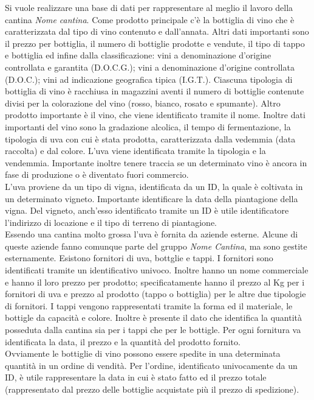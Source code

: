 Si vuole realizzare una base di dati per rappresentare al meglio il lavoro della cantina \emph{Nome cantina}. Come prodotto principale c'è la bottiglia di vino che è caratterizzata dal tipo di vino contenuto e dall'annata. Altri dati importanti sono il prezzo per bottiglia, il numero di bottiglie prodotte e vendute, il tipo di tappo e bottiglia ed infine dalla classificazione: vini a denominazione d'origine controllata e garantita (D.O.C.G.); vini a denominazione d'origine controllata (D.O.C.); vini ad indicazione geografica tipica (I.G.T.). Ciascuna tipologia di bottiglia di vino è racchiusa in magazzini aventi il numero di bottiglie contenute divisi per la colorazione del vino (rosso, bianco, rosato e spumante).
Altro prodotto importante è il vino, che viene identificato tramite il nome. Inoltre dati importanti del vino sono la gradazione alcolica, il tempo di fermentazione, la tipologia di uva con cui è stata prodotta, caratterizzata dalla vedemmia (data raccolta) e dal colore. L'uva viene identificata tramite la tipologia e la vendemmia. Importante inoltre tenere traccia se un determinato vino è ancora in fase di produzione o è diventato fuori commercio.\\
L'uva proviene da un tipo di vigna, identificata da un ID, la quale è coltivata in un determinato vigneto. Importante identificare la data della piantagione della vigna. Del vigneto, anch'esso identificato tramite un ID è utile identificatore l'indirizzo di locazione e il tipo di terreno di piantagione.\\
Essendo una cantina molto grossa l'uva è fornita da aziende esterne. Alcune di queste aziende fanno comunque parte del gruppo \emph{Nome Cantina}, ma sono gestite esternamente. Esistono fornitori di uva, bottglie e tappi.
I fornitori sono identificati tramite un identificativo univoco. Inoltre hanno un nome commerciale e hanno il loro prezzo per prodotto; specificatamente hanno il prezzo al Kg per i fornitori di uva e prezzo al prodotto (tappo o bottiglia) per le altre due tipologie di fornitori.
I tappi vengono rappresentati tramite la forma ed il materiale, le bottigle da capacità e colore. Inoltre è presente il dato che identifica la quantità posseduta dalla cantina sia per i tappi che per le bottigle. Per ogni fornitura va identificata la data, il prezzo e la quantità del prodotto fornito.\\
Ovviamente le bottiglie di vino possono essere spedite in una determinata quantità in un ordine di vendità. Per l'ordine, identificato univocamente da un ID, è utile rappresentare la data in cui è stato fatto ed il prezzo totale (rappresentato dal prezzo delle bottiglie acquistate più il prezzo di spedizione).\\
